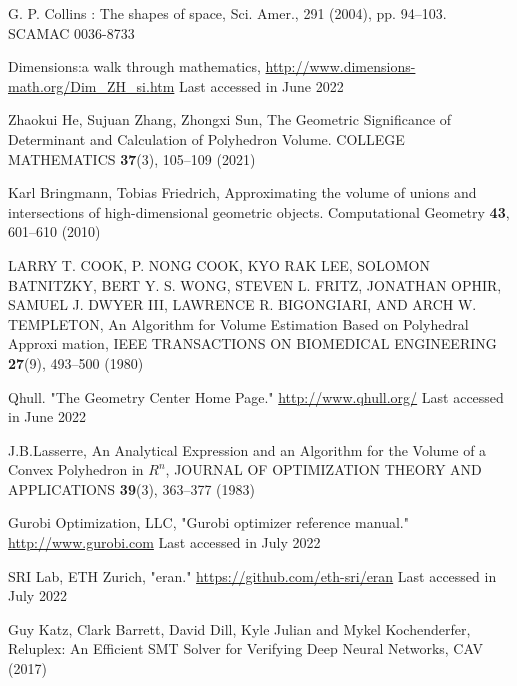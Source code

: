 \documentclass[runningheads]{llncs}
\begin{document}
\begin{thebibliography}{8}
G. P. Collins : The shapes of space, Sci. Amer., 291 (2004), pp. 94–103. SCAMAC 0036-8733

Dimensions:a walk through mathematics, \url{http://www.dimensions-math.org/Dim_ZH_si.htm} Last accessed in
June 2022

Zhaokui He, Sujuan Zhang, Zhongxi Sun, The Geometric Significance of Determinant and Calculation of Polyhedron Volume. COLLEGE MATHEMATICS \textbf{37}(3), 105--109 (2021)

Karl Bringmann, Tobias Friedrich, Approximating the volume of unions and intersections
of high-dimensional geometric objects. Computational Geometry \textbf{43}, 601--610 (2010)

LARRY T. COOK, P. NONG COOK, KYO RAK LEE, SOLOMON BATNITZKY, BERT Y. S. WONG, STEVEN L. FRITZ, JONATHAN OPHIR, SAMUEL J. DWYER III, LAWRENCE R. BIGONGIARI, AND ARCH W. TEMPLETON, An Algorithm for Volume Estimation Based on Polyhedral Approxi mation, IEEE TRANSACTIONS ON BIOMEDICAL ENGINEERING \textbf{27}(9), 493--500 (1980)

Qhull. "The Geometry Center Home Page." \url{http://www.qhull.org/} Last accessed in
June 2022

J.B.Lasserre, An Analytical Expression and an Algorithm for the Volume of a Convex Polyhedron in $R^{n}$, JOURNAL OF OPTIMIZATION THEORY AND APPLICATIONS \textbf{39}(3), 363--377 (1983)

Gurobi Optimization, LLC, "Gurobi optimizer reference manual." \url{http://www.gurobi.com} Last accessed in July 2022

SRI Lab, ETH Zurich, "eran." \url{https://github.com/eth-sri/eran} Last accessed in July 2022

Guy Katz, Clark Barrett, David Dill, Kyle Julian and Mykel Kochenderfer, Reluplex: An Efficient SMT Solver for Verifying Deep Neural Networks, CAV (2017)


\end{thebibliography}
\end{document}
